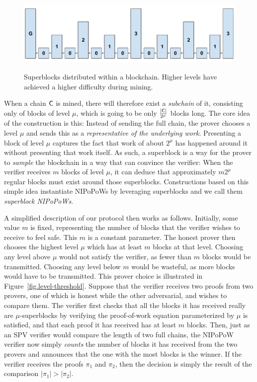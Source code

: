 \begin{figure}[ht]
    \caption{Superblocks distributed within a blockchain.
    Higher levels have achieved a higher difficulty during
    mining.}
    \centering
    \includegraphics[width=0.7\columnwidth,keepaspectratio]{chapters/introduction/figures/superblocks.pdf}
    \label{fig.superblocks}
\end{figure}

When a chain $\mathsf{C}$ is mined, there will therefore exist a \emph{subchain} of
it, consisting only of blocks of level $\mu$, which is going to be only
$\frac{|\mathsf{C}|}{2^\mu}$ blocks long. The core idea of the construction is this:
Instead of sending the full chain, the prover chooses a level $\mu$ and sends
this as a \emph{representative of the underlying work}. Presenting a block of
level $\mu$ captures the fact that work of about $2^\mu$ has happened around it
without presenting that work itself. As such, a superblock is a way for the
prover to \emph{sample} the blockchain in a way that can convince the verifier:
When the verifier receives $m$ blocks of level $\mu$, it can deduce that
approximately $m 2^\mu$ regular blocks must exist around those superblocks.
Constructions based on this simple idea instantiate NIPoPoWs by leveraging
superblocks and we call them \emph{superblock NIPoPoWs}.

A simplified description of our protocol then works as follows. Initially, some value
$m$ is fixed, representing the number of blocks that the verifier wishes to
receive to feel safe. This $m$ is a constant parameter. The honest prover then
chooses the highest level $\mu$ which has at least $m$ blocks at that level.
Choosing any level above $\mu$ would not satisfy the verifier, as fewer than $m$
blocks would be transmitted. Choosing any level below $m$ would be wasteful, as
more blocks would have to be transmitted. This prover choice is illustrated in
Figure~\ref{fig.level-threshold}. Suppose that the verifier receives two
proofs from two provers, one of which is honest while the other adversarial, and
wishes to compare them. The verifier first checks that all the blocks it has
received really are $\mu$-superblocks by verifying the proof-of-work equation
parameterized by $\mu$ is satisfied, and that each proof it has received has at
least $m$ blocks. Then, just as an SPV verifier would compare the length of two
full chains, the NIPoPoW verifier now simply \emph{counts} the number of blocks
it has received from the two provers and announces that the one with the most
blocks is the winner. If the verifier receives the proofs $\pi_1$ and $\pi_2$,
then the decision is simply the result of the comparison $|\pi_1| > |\pi_2|$.


